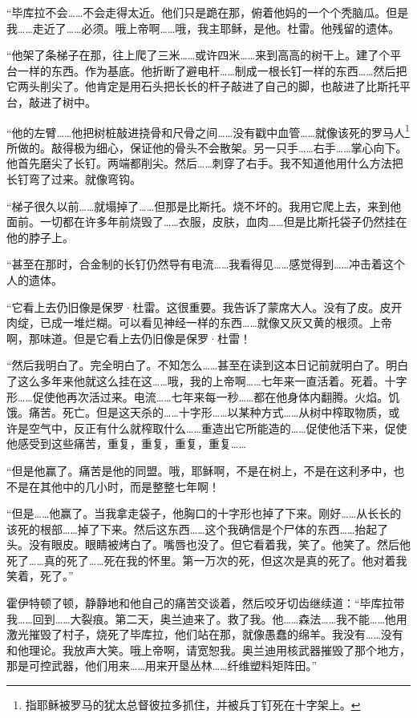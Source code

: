 \documentclass[AutoFakeBold=true]{book}
\begin{document}
``毕库拉不会……不会走得太近。他们只是跪在那，俯着他妈的一个个秃脑瓜。但是我……走近了……必须。哦上帝啊……哦，我主耶稣，是他。杜雷。他残留的遗体。

``他架了条梯子在那，往上爬了三米……或许四米……来到高高的树干上。建了个平台一样的东西。作为基底。他折断了避电杆……制成一根长钉一样的东西……然后把它两头削尖了。他肯定是用石头把长长的杆子敲进了自己的脚，也敲进了比斯托平台，敲进了树中。

``他的左臂……他把树桩敲进挠骨和尺骨之间……没有戳中血管……就像该死的罗马人\footnote{指耶稣被罗马的犹太总督彼拉多抓住，并被兵丁钉死在十字架上。}所做的。敲得极为细心，保证他的骨头不会散架。另一只手……右手……掌心向下。他首先磨尖了长钉。两端都削尖。然后……刺穿了右手。我不知道他用什么方法把长钉弯了过来。就像弯钩。

``梯子很久以前……就塌掉了……但那是比斯托。烧不坏的。我用它爬上去，来到他面前。一切都在许多年前烧毁了……衣服，皮肤，血肉……但是比斯托袋子仍然挂在他的脖子上。

``甚至在那时，合金制的长钉仍然导有电流……我看得见……感觉得到……冲击着这个人的遗体。

``它看上去仍旧像是保罗·杜雷。这很重要。我告诉了蒙席大人。没有了皮。皮开肉绽，已成一堆烂糊。可以看见神经一样的东西……就像又灰又黄的根须。上帝啊，那味道。但是它看上去仍旧像是保罗·杜雷！

``然后我明白了。完全明白了。不知怎么……甚至在读到这本日记前就明白了。明白了这么多年来他就这么挂在这……哦，我的上帝啊……七年来一直活着。死着。十字形……促使他再次活过来。电流……七年来每一秒……都在他身体内翻腾。火焰。饥饿。痛苦。死亡。但是这天杀的……十字形……以某种方式……从树中榨取物质，或许是空气中，反正有什么就榨取什么……重造出它所能造的……促使他活下来，促使他感受到这些痛苦，重复，重复，重复，重复……

``但是他赢了。痛苦是他的同盟。哦，耶稣啊，不是在树上，不是在这利矛中，也不是在其他中的几小时，而是整整七年啊！

``但是……他赢了。当我拿走袋子，他胸口的十字形也掉了下来。刚好……从长长的该死的根部……掉了下来。然后这东西……这个我确信是个尸体的东西……抬起了头。没有眼皮。眼睛被烤白了。嘴唇也没了。但它看着我，笑了。他笑了。然后他死了……真的死了……死在我的怀里。第一万次的死，但这次是真的死了。他对着我笑着，死了。''

霍伊特顿了顿，静静地和他自己的痛苦交谈着，然后咬牙切齿继续道：``毕库拉带我……回到……大裂痕。第二天，奥兰迪来了。救了我。他……森法……我不能……他用激光摧毁了村子，烧死了毕库拉，他们站在那，就像愚蠢的绵羊。我没有……没有和他理论。我放声大笑。哦上帝啊，请宽恕我。奥兰迪用核武器摧毁了那个地方，那是可控武器，他们用来……用来开垦丛林……纤维塑料矩阵田。''
\end{document}
